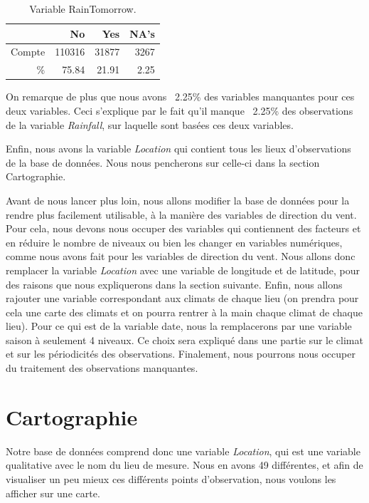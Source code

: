\documentclass{article}
\begin{document}
\begin{table}[htp]
    \centering
    \begin{tabular}{|r||rrr|}
        \hline
        &    No &    Yes &   NA's \\
        \hline
        \hline
        Compte & 110316 &  31877 &   3267 \\
        \% & 75.84 & 21.91 & 2.25 \\
        \hline
    \end{tabular}
    \caption{Variable RainTomorrow.}
    \label{table:rain_tomorrow}
\end{table}

On remarque de plus que nous avons ~2.25\% des variables manquantes pour ces deux variables. Ceci s'explique par le fait qu'il manque ~2.25\% des observations de la variable \emph{Rainfall}, sur laquelle sont basées ces deux variables.

Enfin, nous avons la variable \emph{Location} qui contient tous les lieux d'observations de la base de données. Nous nous pencherons sur celle-ci dans la section Cartographie. 

Avant de nous lancer plus loin, nous allons modifier la base de données pour la rendre plus facilement utilisable, à la manière des variables de direction du vent. Pour cela, nous devons nous occuper des variables qui contiennent des facteurs et en réduire le nombre de niveaux ou bien les changer en variables numériques, comme nous avons fait pour les variables de direction du vent. Nous allons donc remplacer la variable \emph{Location} avec une variable de longitude et de latitude, pour des raisons que nous expliquerons dans la section suivante. Enfin, nous allons rajouter une variable correspondant aux climats de chaque lieu (on prendra pour cela une carte des climats et on pourra rentrer à la main chaque climat de chaque lieu). Pour ce qui est de la variable date, nous la remplacerons par une variable saison à seulement 4 niveaux. Ce choix sera expliqué dans une partie sur le climat et sur les périodicités des observations. Finalement, nous pourrons nous occuper du traitement des observations manquantes. 

\section{Cartographie}

Notre base de données comprend donc une variable \emph{Location}, qui est une variable qualitative avec le nom du lieu de mesure. Nous en avons 49 différentes, et afin de visualiser un peu mieux ces différents points d'observation, nous voulons les afficher sur une carte. 
\end{document}
